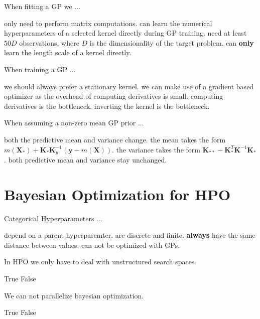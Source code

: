 \documentclass{exam}
\newcommand{\Xmat}{\mathbf{X}}
\newcommand{\Kmat}{\mathbf{K}}
\begin{document}
\begin{questions}
		\question When fitting a GP we ...
		\begin{choices}
			\choice only need to perform matrix computations. %
			\choice can learn the numerical hyperparameters of a selected kernel directly during GP training. %
			\choice need at least $50D$ observations, where $D$ is the dimensionality of the target problem.
			\choice can \textbf{only} learn the length scale of a kernel directly.
		\end{choices}
		
		\question When training a GP ...
		\begin{choices}
			\choice we should always prefer a stationary kernel.
			\choice we can make use of a gradient based optimizer as the overhead of computing derivatives is small. %
			\choice computing derivatives is the bottleneck.
			\choice inverting the kernel is the bottleneck. %
		\end{choices}
		
		\question When assuming a non-zero mean GP prior ...
		\begin{choices}
			\choice both the predictive mean and variance change.
			\choice the mean takes the form $m(\Xmat_*) + \Kmat_*\Kmat_y^{-1}\left(\bm{y} - m(\Xmat)\right)$. %
			\choice the variance takes the form $\Kmat_{**} - \Kmat_*^T \Kmat ^{-1}\Kmat_*$. %
			\choice both predictive mean and variance stay unchanged.
		\end{choices}
		
		
		\clearpage
		\section{Bayesian Optimization for HPO}
		\question Categorical Hyperparameters ...
		\begin{choices}
			\choice depend on a parent hyperparemter.
			\choice are discrete and finite. %
			\choice \textbf{always} have the same distance between values.
			\choice can not be optimized with GPs.
		\end{choices}
		
		\question In HPO we only have to deal with unstructured search spaces.
		\begin{choices}
			\choice True
			\choice False %
		\end{choices}
		
		\question We can not parallelize bayesian optimization.
		\begin{choices}
			\choice True
			\choice False %
		\end{choices}
		

\end{questions}
\end{document}
